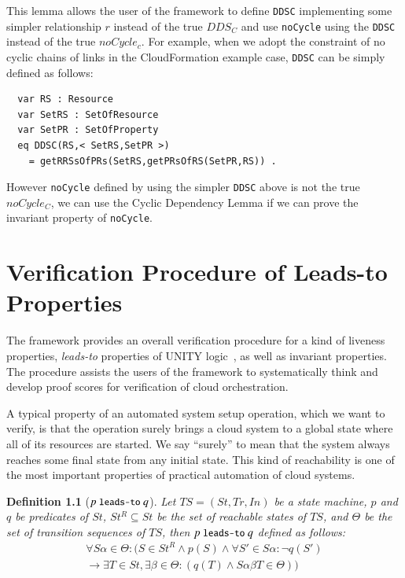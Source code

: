 \documentclass[12pt]{report}
\newtheorem{definition}{Definition}
\newcommand{\ra}{\rightarrow}
\newcommand{\mbstt}[1]{\mbox{\small{\tt {#1}}}}
\newcommand{\ul}{\underline}
\begin{document}
This lemma allows the user of the framework to define {\tt DDSC}
implementing some simpler relationship $r$ instead of the true $DDS_C$
and use {\tt noCycle} using the {\tt DDSC} instead of the true
$noCycle_c$. For example, when we adopt the constraint of no cyclic
chains of links in the CloudFormation example case, {\tt DDSC} can be
simply defined as follows:
\small
\begin{verbatim}
  var RS : Resource
  var SetRS : SetOfResource
  var SetPR : SetOfProperty
  eq DDSC(RS,< SetRS,SetPR >)
    = getRRSsOfPRs(SetRS,getPRsOfRS(SetPR,RS)) .
\end{verbatim}
\normalsize
However {\tt noCycle} defined by using the simpler {\tt DDSC} above is
 not the true $noCycle_C$, we can use the Cyclic Dependency Lemma if
 we can prove the invariant property of {\tt noCycle}.

\chapter{Verification Procedure of Leads-to Properties}
\label{chap:verification}
The framework provides an overall verification procedure for a kind of
liveness properties, {\it leads-to} properties of UNITY
logic~\cite{DBLP:books/daglib/0067338}, as well as invariant
properties.  The procedure assists the users of the framework to
systematically think and develop proof scores for verification of
cloud orchestration.

A typical property of an automated system setup operation, which we
want to verify, is that the operation surely brings a cloud system to
a global state where all of its resources are started.  We say ``surely''
to mean that the system always reaches some final state from any
initial state. This kind of reachability is one of the most important
properties of practical automation of cloud systems.

\begin{definition}[$p~\mbstt{leads-to}~q$]
  Let $TS=(St,Tr,In)$ be a state machine, $p$ and $q$ be predicates of
  $St$, $St^R\subseteq St$ be the set of reachable states of $TS$, and
  $\Theta$ be the set of transition sequences of $TS$, then
  \ul{$p~\mbstt{leads-to}~q$} defined as follows:
  \begin{eqnarray*}
  \forall S\alpha\in \Theta: (S\in St^R \land p(S) \land
  \forall S'\in S\alpha: \neg q(S')\\
  \ra \exists T\in St, \exists\beta\in\Theta:(q(T) \land S\alpha\beta T\in \Theta))
  \end{eqnarray*}
\end{definition}
\end{document}
